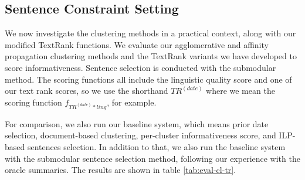 \documentclass[a4paper,BCOR=10mm]{report}
\numberwithin{lemma}{chapter}
\numberwithin{definition}{chapter}
\begin{document}


\subsection{Sentence Constraint Setting}

%
%



We now investigate the clustering methods in a practical context, along with our modified TextRank functions.
We evaluate our agglomerative and affinity propagation clustering methods and the TextRank variants we have developed to score informativeness. Sentence selection is conducted with the submodular method.
The scoring functions all include the linguistic quality score and one of our text rank scores, so we use the shorthand $TR^{(date)}$ where we mean the scoring function $f_{TR^{(date)} * ling}$, for example.

For comparison, we also run our baseline system, which means prior date selection, document-based clustering, per-cluster informativeness score, and ILP-based sentences selection.
In addition to that, we also run the baseline system with the submodular sentence selection method, following our experience with the oracle summaries.
The results are shown in table \ref{tab:eval-cl-tr}.
\end{document}
